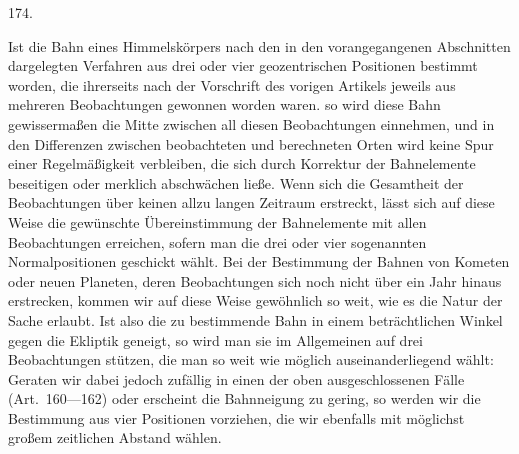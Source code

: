 \par{}\medskip
\begin{center}\hypertarget{native-245-article174}{}174.\end{center}
Ist die Bahn eines Himmelskörpers nach den in den vorangegangenen Abschnitten dargelegten Verfahren aus drei oder vier geozentrischen Positionen bestimmt worden, die ihrerseits nach der Vorschrift des vorigen Artikels jeweils aus mehreren Beobachtungen gewonnen worden waren. so wird diese Bahn gewissermaßen die Mitte zwischen all diesen Beobachtungen einnehmen, und in den Differenzen zwischen beobachteten und berechneten Orten wird keine Spur einer Regelmäßigkeit verbleiben, die sich durch Korrektur der Bahnelemente beseitigen oder merklich abschwächen ließe. Wenn sich die Gesamtheit der Beobachtungen über keinen allzu langen Zeitraum erstreckt, lässt sich auf diese Weise die gewünschte Übereinstimmung der Bahnelemente mit allen Beobachtungen erreichen, sofern man die drei oder vier sogenannten Normalpositionen geschickt wählt. Bei der Bestimmung der Bahnen von Kometen oder neuen Planeten, deren Beobachtungen sich noch nicht über ein Jahr hinaus erstrecken, kommen wir auf diese Weise gewöhnlich so weit, wie es die Natur der Sache erlaubt. Ist also die zu bestimmende Bahn in einem beträchtlichen Winkel gegen die Ekliptik geneigt, so wird man sie im Allgemeinen auf drei Beobachtungen stützen, die man so weit wie möglich auseinanderliegend wählt: Geraten wir dabei jedoch zufällig in einen der oben ausgeschlossenen Fälle (Art.\ 160---162) oder erscheint die Bahnneigung zu gering, so werden wir die Bestimmung aus vier Positionen vorziehen, die wir ebenfalls mit möglichst großem zeitlichen Abstand wählen.


